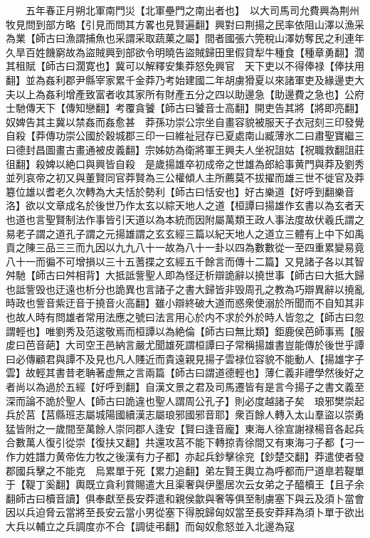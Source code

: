 　　五年春正月朔北軍南門災【北軍壘門之南出者也】　以大司馬司允費興為荆州牧見問到部方略【引見而問其方畧也見賢遍翻】興對曰荆揚之民率依阻山澤以漁采為業【師古曰漁謂捕魚也采謂采取蔬菓之屬】間者國張六筦稅山澤妨奪民之利連年久旱百姓饑窮故為盜賊興到部欲令明曉告盜賊歸田里假貸犁牛種食【種章勇翻】濶其租賦【師古曰濶寛也】冀可以解釋安集莽怒免興官　天下吏以不得俸禄【俸扶用翻】並為姦利郡尹縣宰家累千金莽乃考始建國二年胡虜猾夏以來諸軍吏及緣邊吏大夫以上為姦利增產致富者收其家所有財產五分之四以助邊急【助邊費之急也】公府士馳傳天下【傳知戀翻】考覆貪饕【師古曰饕音士高翻】開吏告其將【將即亮翻】奴婢告其主冀以禁姦而姦愈甚　莽孫功崇公宗坐自畫容貌被服天子衣冠刻三印發覺自殺【莽傳功崇公國於穀城郡三印一曰維祉冠存已夏處南山臧薄氷二曰肅聖寶繼三曰德封昌圖畫古畫通被皮義翻】宗姊妨為衛將軍王興夫人坐祝詛姑【祝職救翻詛莊徂翻】殺婢以絶口與興皆自殺　是歲揚雄卒初成帝之世雄為郎給事黄門與莽及劉秀並列哀帝之初又與董賢同官莽賢為三公權傾人主所薦莫不拔擢而雄三世不徙官及莽簒位雄以耆老久次轉為大夫恬於勢利【師古曰恬安也】好古樂道【好呼到翻樂音洛】欲以文章成名於後世乃作太玄以綜天地人之道【桓譚曰揚雄作玄書以為玄者天也道也言聖賢制法作事皆引天道以為本統而因附屬萬類王政人事法度故伏羲氏謂之易老子謂之道孔子謂之元揚雄謂之玄玄經三篇以紀天地人之道立三體有上中下如禹貢之陳三品三三而九因以九九八十一故為八十一卦以四為數數從一至四重累變易竟八十一而徧不可增損以三十五蓍揲之玄經五千餘言而傳十二篇】又見諸子各以其智舛馳【師古曰舛相背】大抵詆訾聖人即為怪迂析辯詭辭以撓世事【師古曰大抵大歸也詆訾毁也迂遠也析分也詭異也言諸子之書大歸皆非毁周孔之教為巧辯異辭以撓亂時政也訾音紫迂音于撓音火高翻】雖小辯終破大道而惑衆使溺於所聞而不自知其非也故人時有問雄者常用法應之號曰法言用心於内不求於外於時人皆忽之【師古曰忽謂輕也】唯劉秀及范逡敬焉而桓譚以為絶倫【師古曰無比類】鉅鹿侯芭師事焉【服䖍曰芭音葩】大司空王邑納言嚴尤聞雄死謂桓譚曰子常稱揚雄書豈能傳於後世乎譚曰必傳顧君與譚不及見也凡人賤近而貴遠親見揚子雲禄位容貌不能動人【揚雄字子雲】故輕其書昔老聃著虚無之言兩篇【師古曰謂道德輕也】薄仁義非禮學然後好之者尚以為過於五經【好呼到翻】自漢文景之君及司馬遷皆有是言今揚子之書文義至深而論不詭於聖人【師古曰詭違也聖人謂周公孔子】則必度越諸子矣　琅邪樊崇起兵於莒【莒縣班志屬城陽國續漢志屬琅邪國邪音耶】衆百餘人轉入太山羣盜以崇勇猛皆附之一歲間至萬餘人崇同郡人逢安【賢曰逢音龐】東海人徐宣謝禄楊音各起兵合數萬人復引從崇【復扶又翻】共還攻莒不能下轉掠青徐間又有東海刁子都【刁一作力姓譜力黄帝佐力牧之後漢有力子都】亦起兵鈔擊徐兖【鈔楚交翻】莽遣使者發郡國兵擊之不能克　烏累單于死【累力追翻】弟左賢王輿立為呼都而尸道臯若鞮單于【鞮丁奚翻】輿既立貪利賞賜遣大且渠奢與伊墨居次云女弟之子醯櫝王【且子余翻師古曰櫝音讀】俱奉獻至長安莽遣和親侯歙與奢等俱至制虜塞下與云及須卜當會因以兵迫脅云當將至長安云當小男從塞下得脫歸匈奴當至長安莽拜為須卜單于欲出大兵以輔立之兵調度亦不合【調徒弔翻】而匈奴愈怒並入北邊為寇

